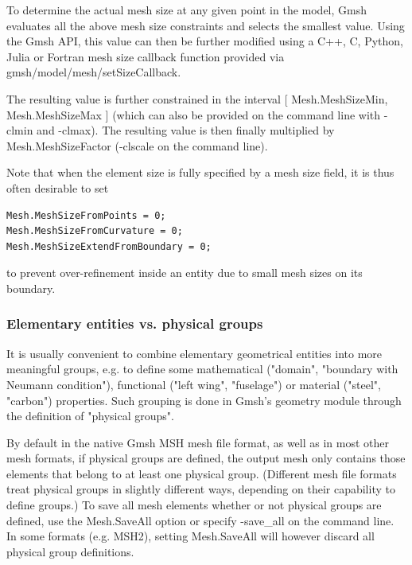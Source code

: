 \documentclass[dvipdfmx, 9pt, a4paper]{article}
\numberwithin{equation}{section}
\begin{document}
To determine the actual mesh size at any given point in the model, Gmsh evaluates all the above mesh size constraints and selects the smallest value. Using the Gmsh API, this value can then be further modified using a C++, C, Python, Julia or Fortran mesh size callback function provided via gmsh/model/mesh/setSizeCallback.\par
The resulting value is further constrained in the interval [ Mesh.MeshSizeMin, Mesh.MeshSizeMax ] (which can also be provided on the command line with -clmin and -clmax). The resulting value is then finally multiplied by Mesh.MeshSizeFactor (-clscale on the command line).\par
Note that when the element size is fully specified by a mesh size field, it is thus often desirable to set
\begin{lstlisting}
Mesh.MeshSizeFromPoints = 0;
Mesh.MeshSizeFromCurvature = 0;
Mesh.MeshSizeExtendFromBoundary = 0;
\end{lstlisting}
to prevent over-refinement inside an entity due to small mesh sizes on its boundary.

\subsubsection{Elementary entities vs. physical groups}
It is usually convenient to combine elementary geometrical entities into more meaningful groups, e.g. to define some mathematical ("domain", "boundary with Neumann condition"), functional ("left wing", "fuselage") or material ("steel", "carbon") properties. Such grouping is done in Gmsh's geometry module through the definition of "physical groups".\par
By default in the native Gmsh MSH mesh file format, as well as in most other mesh formats, if physical groups are defined, the output
mesh only contains those elements that belong to at least one physical group. (Different mesh file formats treat physical groups in slightly different ways, depending on their capability to define groups.) To save all mesh elements whether or not physical groups are defined, use the Mesh.SaveAll option or specify -save\_all on the command line. In some formats (e.g. MSH2), setting Mesh.SaveAll will however discard all physical group definitions.
\end{document}

